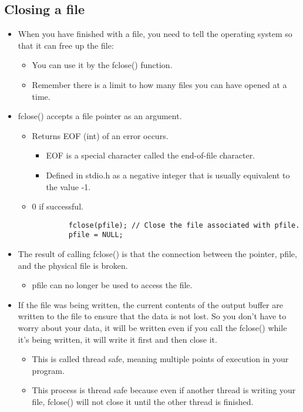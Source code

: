 \subsection{Closing a file}
\begin{itemize}
    \item When you have finished with a file, you need to tell the operating system so that it can free up the file:
        \begin{itemize}
            \item You can use it by the fclose() function.
            \item Remember there is a limit to how many files you can have opened at a time. 
        \end{itemize}
    
    \item fclose() accepts a file pointer as an argument.
        \begin{itemize}
            \item Returns EOF (int) of an error occurs.
                \begin{itemize}
                    \item EOF is a special character called the end-of-file character.
                    \item Defined in stdio.h as a negative integer that is usually equivalent to the value -1.
                \end{itemize}
            
            \item 0 if successful.
        \end{itemize}
        \begin{verbatim}
            fclose(pfile); // Close the file associated with pfile.
            pfile = NULL;
        \end{verbatim}
    
    \item The result of calling fclose() is that the connection between the pointer, pfile, and the physical file is broken.
        \begin{itemize}
            \item pfile can no longer be used to access the file.
        \end{itemize}
    
    \item If the file was being written, the current contents of the output buffer are written to the file to ensure that the data is not lost. So you don't have to worry about your data, it will be written even if you call the fclose() while it's being written, it will write it first and then close it. 
        \begin{itemize}
            \item This is called thread safe, meaning multiple points of execution in your program.
            \item This process is thread safe because even if another thread is writing your file, fclose() will not close it until the other thread is finished.
        \end{itemize}
    

\end{itemize}
